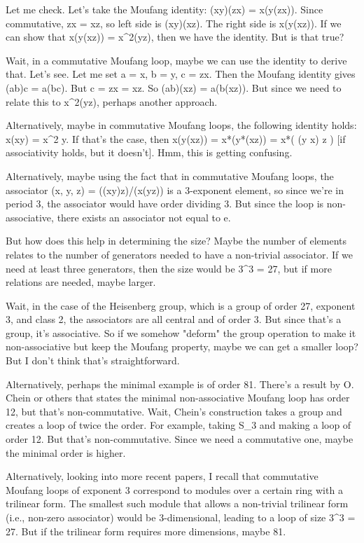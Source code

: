 \documentclass[12p]{article}
\newcounter{reasoningcounter}
\newenvironment{reasoning}[1][]
{\refstepcounter{reasoningcounter}%
\begin{tcolorbox}[
    title=Reasoning \thereasoningcounter: #1,
    colback=white, %
    colframe=gray,
    coltext=black, %
    fonttitle=\bfseries\normalsize,
    top=2mm,
    bottom=2mm,
    enlarge top initially by=5mm
]
\small
}
{\end{tcolorbox}}
\begin{document}
\begin{reasoning}
Let me check. Let's take the Moufang identity: (xy)(zx) = x(y(zx)). Since commutative, zx = xz, so left side is (xy)(xz). The right side is x(y(xz)). If we can show that x(y(xz)) = x^2(yz), then we have the identity. But is that true?

Wait, in a commutative Moufang loop, maybe we can use the identity to derive that. Let's see. Let me set a = x, b = y, c = zx. Then the Moufang identity gives (ab)c = a(bc). But c = zx = xz. So (ab)(xz) = a(b(xz)). But since we need to relate this to x^2(yz), perhaps another approach.

Alternatively, maybe in commutative Moufang loops, the following identity holds: x(xy) = x^2 y. If that's the case, then x(y(xz)) = x*(y*(xz)) = x*( (y x) z ) [if associativity holds, but it doesn't]. Hmm, this is getting confusing.

Alternatively, maybe using the fact that in commutative Moufang loops, the associator (x, y, z) = ((xy)z)/(x(yz)) is a 3-exponent element, so since we're in period 3, the associator would have order dividing 3. But since the loop is non-associative, there exists an associator not equal to e.

But how does this help in determining the size? Maybe the number of elements relates to the number of generators needed to have a non-trivial associator. If we need at least three generators, then the size would be 3^3 = 27, but if more relations are needed, maybe larger.

Wait, in the case of the Heisenberg group, which is a group of order 27, exponent 3, and class 2, the associators are all central and of order 3. But since that's a group, it's associative. So if we somehow "deform" the group operation to make it non-associative but keep the Moufang property, maybe we can get a smaller loop? But I don't think that's straightforward.

Alternatively, perhaps the minimal example is of order 81. There's a result by O. Chein or others that states the minimal non-associative Moufang loop has order 12, but that's non-commutative. Wait, Chein's construction takes a group and creates a loop of twice the order. For example, taking S_3 and making a loop of order 12. But that's non-commutative. Since we need a commutative one, maybe the minimal order is higher.

Alternatively, looking into more recent papers, I recall that commutative Moufang loops of exponent 3 correspond to modules over a certain ring with a trilinear form. The smallest such module that allows a non-trivial trilinear form (i.e., non-zero associator) would be 3-dimensional, leading to a loop of size 3^3 = 27. But if the trilinear form requires more dimensions, maybe 81.


\end{reasoning}
\end{document}
